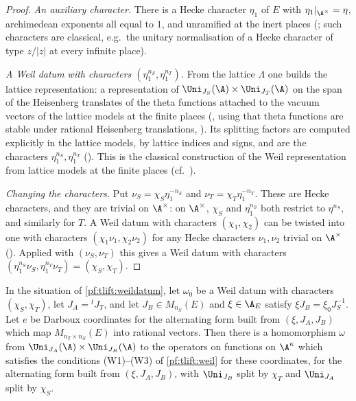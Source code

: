 \begin{proof}
\emph{An auxiliary character.} There is a Hecke character $\eta_1$ of $E$ with $\eta_1|_{\A^\times}=\eta$, archimedean
exponents all equal to $1$, and unramified at the inert places
(; such characters are classical, e.g.\ the unitary normalisation of a
Hecke character of type $z/|z|$ at every infinite place).

\emph{A Weil datum with characters $(\eta_1^{n_S},\eta_1^{n_T})$.} From the lattice $\Lambda$ one builds the lattice
representation: a representation of $\Uni_{J_S}(\A)\times\Uni_{J_T}(\A)$ on the span of the Heisenberg translates of
the theta functions attached to the vacuum vectors of the lattice models at the finite places
(, using that theta functions are stable under rational Heisenberg translations,
). Its splitting factors are computed explicitly in the
lattice models, by lattice indices and signs, and are the characters $\eta_1^{n_S},\eta_1^{n_T}$
(). This is the classical construction of the Weil representation from lattice
models at the finite places (cf.\ \cite{Weil1964,MoeglinVignerasWaldspurger1987}).

\emph{Changing the characters.} Put $\nu_S=\chi_S\eta_1^{-n_S}$ and $\nu_T=\chi_T\eta_1^{-n_T}$. These are Hecke characters,
and they are trivial on $\A^\times$: on $\A^\times$, $\chi_S$ and $\eta_1^{n_S}$ both restrict to $\eta^{n_S}$, and similarly for $T$.
A Weil datum with characters $(\chi_1,\chi_2)$ can be twisted into one with characters $(\chi_1\nu_1,\chi_2\nu_2)$ for any
Hecke characters $\nu_1,\nu_2$ trivial on $\A^\times$ (). Applied
with $(\nu_S,\nu_T)$ this gives a Weil datum with characters $(\eta_1^{n_S}\nu_S,\eta_1^{n_T}\nu_T)=(\chi_S,\chi_T)$.
\end{proof}

\begin{proposition}\label{pf:tlift:weilpairhp}
In the situation of \cref{pf:tlift:weildatum}, let $\omega_0$ be a Weil datum with characters $(\chi_S,\chi_T)$, let
$J_A={}^tJ_T$, and let $J_B\in M_{n_S}(E)$ and $\xi\in\tliftAE$ satisfy $\xi J_B=\xi_0J_S^{-1}$. Let $e$ be Darboux
coordinates for the alternating form built from $(\xi,J_A,J_B)$ which map $M_{n_T\times n_S}(E)$ into rational vectors.
Then there is a homomorphism $\omega$ from $\Uni_{J_A}(\A)\times\Uni_{J_B}(\A)$ to the operators on functions on $\A^\kappa$
which satisfies the conditions (W1)--(W3) of \cref{pf:tlift:weil} for these coordinates, for the alternating form built
from $(\xi,J_A,J_B)$, with $\Uni_{J_B}$ split by $\chi_T$ and $\Uni_{J_A}$ split by $\chi_S$.
\end{proposition}

